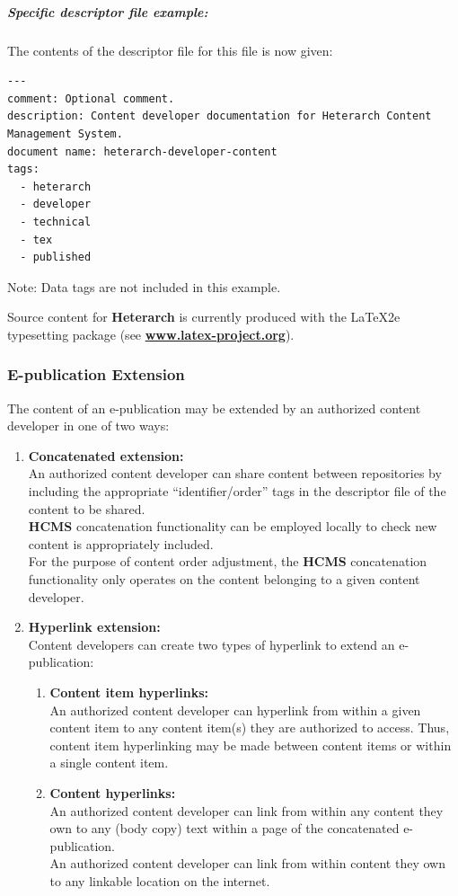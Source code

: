 \documentclass[12pt]{article}
\begin{document}
\subparagraph{\bf Specific descriptor file example:} The contents of the descriptor file for this file is now given:

\begin{verbatim}
---
comment: Optional comment.
description: Content developer documentation for Heterarch Content Management System.
document name: heterarch-developer-content
tags:
  - heterarch
  - developer
  - technical
  - tex
  - published
\end{verbatim}
Note: Data tags are not included in this example.

Source content for {\bf\small Heterarch} is currently produced with the \LaTeX2e\,typesetting package (see \href{http://www.latex-project.org/}{\bf www.latex-project.org}).

\subsubsection*{E-publication Extension}
The content of an e-publication may be extended by an authorized content developer in one of two ways:
\begin{enumerate}
\item {\bf Concatenated extension:}\\
An authorized content developer can share content between repositories by including the appropriate ``identifier/order'' tags in the descriptor file of the content to be shared.\\
{\bf \small HCMS} concatenation functionality can be employed locally to check new content is appropriately included.\\
For the purpose of content order adjustment, the {\bf \small HCMS} concatenation functionality only operates on the content belonging to a given content developer.
\item {\bf Hyperlink extension:}\\
Content developers can create two types of hyperlink to extend an e-publication:
	\begin{enumerate}
	\item {\bf Content item hyperlinks:}\\
	An authorized content developer can hyperlink from within a given content item to any content item(s) they are authorized to access. Thus, content item hyperlinking may be made between content items or within a single content item. 
	\item {\bf Content hyperlinks:}\\
	An authorized content developer can link from within any content they own to any (body copy) text within a page of the concatenated e-publication.\\
	An authorized content developer can link from within content they own to any linkable location on the internet.
 	\end{enumerate}
\end{enumerate}
\end{document}
